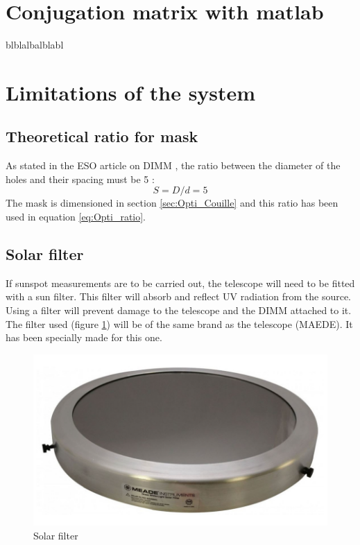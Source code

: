 \section{Conjugation matrix with matlab}
blblalbalblabl
\section{Limitations of the system}\label{sec:Opti_Limit}
\subsection{Theoretical ratio for mask}
As stated in the ESO article on DIMM \cite{DIMM_ESO}, the ratio between the diameter of the holes and their spacing must be 5 :
\begin{equation}\label{eq:Opti_Ratio}
    S = D/d = 5
\end{equation}
The mask is dimensioned in section \ref{sec:Opti_Couille} and this ratio has been used in equation \ref{eq:Opti_ratio}.
\subsection{Solar filter}
If sunspot measurements are to be carried out, the telescope will need to be fitted with a sun filter. This filter will
absorb and reflect UV radiation from the source. Using a filter will prevent damage to the telescope and the DIMM attached to it.
The filter used (figure \ref{fig:Opti_Filter}) will be of the same brand as the telescope (MAEDE). It has been specially made for this one.
\begin{figure}[H]
    \centering
    \includegraphics[scale=0.6]{assets/figures/Optical Design/Solar_filter.png}
    \caption{Solar filter}
    \label{fig:Opti_Filter}
\end{figure}
\newpage
